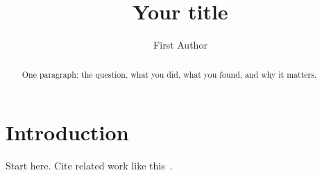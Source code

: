 \documentclass[acmsmall,screen]{acmart}
\begin{document}
\title{Your title}
\author{First Author}

\begin{abstract}
One paragraph: the question, what you did, what you found, and why it matters.
\end{abstract}
\maketitle

\section{Introduction}
Start here. Cite related work like this~\cite{knuth1984}.



\end{document}
